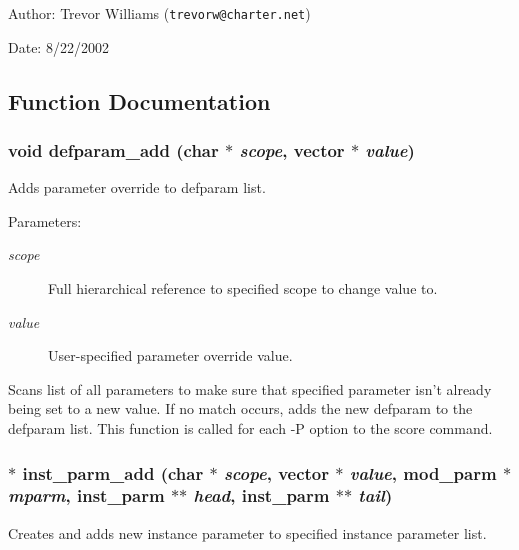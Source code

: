 \begin{Desc}
\item[Author:]Trevor Williams ({\tt trevorw@charter.net}) \end{Desc}
\begin{Desc}
\item[Date:]8/22/2002 \end{Desc}


\subsection{Function Documentation}
\subsubsection{\setlength{\rightskip}{0pt plus 5cm}void defparam\_\-add (char $\ast$ {\em scope}, {\bf vector} $\ast$ {\em value})}\label{param_8h_a7}


Adds parameter override to defparam list.

\begin{Desc}
\item[Parameters:]
\begin{description}
\item[{\em scope}]Full hierarchical reference to specified scope to change value to. \item[{\em value}]User-specified parameter override value.\end{description}
\end{Desc}
Scans list of all parameters to make sure that specified parameter isn't already being set to a new value. If no match occurs, adds the new defparam to the defparam list. This function is called for each -P option to the score command. 
\subsubsection{$\ast$ inst\_\-parm\_\-add (char $\ast$ {\em scope}, {\bf vector} $\ast$ {\em value}, {\bf mod\_\-parm} $\ast$ {\em mparm}, {\bf inst\_\-parm} $\ast$$\ast$ {\em head}, {\bf inst\_\-parm} $\ast$$\ast$ {\em tail})}\label{param_8h_a6}


Creates and adds new instance parameter to specified instance parameter list.

